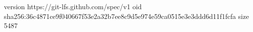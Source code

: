 version https://git-lfs.github.com/spec/v1
oid sha256:36c4871ce9f040667f53e2a32b7ee8c9d5e974e59ca0515e3e3ddd6d11f1fcfa
size 5487
